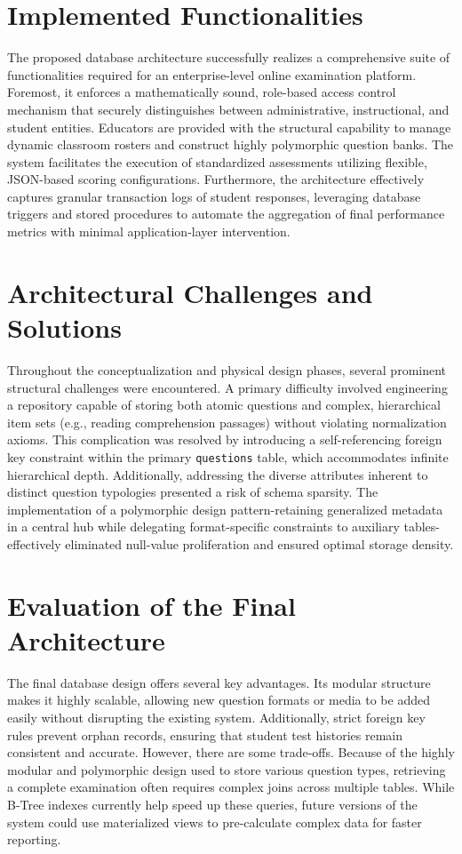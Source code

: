 \documentclass[../report_main.tex]{subfiles}
\begin{document}
\section{Implemented Functionalities}
The proposed database architecture successfully realizes a comprehensive suite of functionalities required for an enterprise-level online examination platform. Foremost, it enforces a mathematically sound, role-based access control mechanism that securely distinguishes between administrative, instructional, and student entities. Educators are provided with the structural capability to manage dynamic classroom rosters and construct highly polymorphic question banks. The system facilitates the execution of standardized assessments utilizing flexible, JSON-based scoring configurations. Furthermore, the architecture effectively captures granular transaction logs of student responses, leveraging database triggers and stored procedures to automate the aggregation of final performance metrics with minimal application-layer intervention.

\section{Architectural Challenges and Solutions}
Throughout the conceptualization and physical design phases, several prominent structural challenges were encountered. A primary difficulty involved engineering a repository capable of storing both atomic questions and complex, hierarchical item sets (e.g., reading comprehension passages) without violating normalization axioms. This complication was resolved by introducing a self-referencing foreign key constraint within the primary \texttt{questions} table, which accommodates infinite hierarchical depth. Additionally, addressing the diverse attributes inherent to distinct question typologies presented a risk of schema sparsity. The implementation of a polymorphic design pattern-retaining generalized metadata in a central hub while delegating format-specific constraints to auxiliary tables-effectively eliminated null-value proliferation and ensured optimal storage density.

\section{Evaluation of the Final Architecture}
The final database design offers several key advantages. Its modular structure makes it highly scalable, allowing new question formats or media to be added easily without disrupting the existing system. Additionally, strict foreign key rules prevent orphan records, ensuring that student test histories remain consistent and accurate. However, there are some trade-offs. Because of the highly modular and polymorphic design used to store various question types, retrieving a complete examination often requires complex joins across multiple tables. While B-Tree indexes currently help speed up these queries, future versions of the system could use materialized views to pre-calculate complex data for faster reporting.
\end{document}
